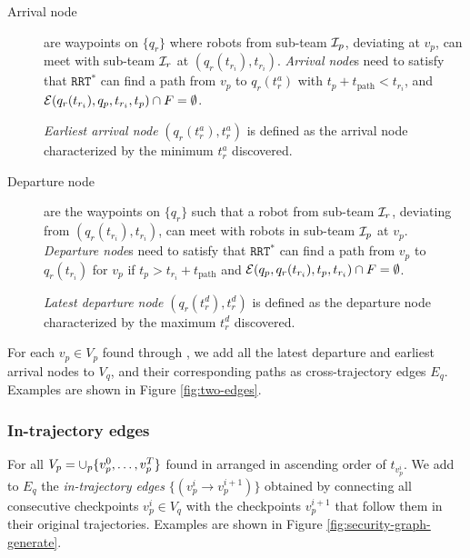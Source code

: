 \documentclass[journal]{IEEEtran}  %
\newcommand{\rrtstar}{$\texttt{RRT}^\texttt{*}$}
\begin{document}
\begin{description}
\item[Arrival node] are waypoints on $\{q_r\}$ where robots from sub-team $\mathcal{I}_p$, deviating at $v_p$, can meet with sub-team $\mathcal{I}_r$ at $(q_r(t_{r_i}),t_{r_i})$. \emph{Arrival node}s need to satisfy that \rrtstar{} can find a path from $v_p$ to $q_{r}(t^{a}_r)$ with $t_{p}+t_{\textrm{path}}<t_{{r}_{i}}$, and $\mathcal{E}(q_{r}(t_{{r}_{i}}),q_{p},t_{{r}_{i}},t_{p}) \cap F = \emptyset$.

\emph{Earliest arrival node} $(q_{r}(t^{a}_r),t^{a}_r)$ is defined as the arrival node characterized by the minimum $t^{a}_r$ discovered. 

\item[Departure node] are the waypoints on $\{q_r\}$ such that a robot from sub-team $\mathcal{I}_r$, deviating from $(q_{r}(t_{{r}_{i}}),t_{{r}_{i}})$, can meet with robots in sub-team $\mathcal{I}_p$ at $v_{p}$. \emph{Departure node}s need to satisfy that \rrtstar{} can find a path from $v_p$ to $q_{r}(t_{{r}_{i}})$ for $v_p$ if  $t_{p}>t_{{r}_{i}}+t_{\textrm{path}}$ and $\mathcal{E}(q_{p}, q_{r}(t_{{r}_{i}}),t_{p}, t_{{r}_{i}}) \cap F = \emptyset$. 

\emph{Latest departure node} $(q_{r}(t^{d}_r),t^{d}_r)$ is defined as the departure node characterized by the maximum $t^{d}_r$ discovered.
\end{description}

For each $v_{p} \in V_{p}$ found through , we add all the latest departure and earliest arrival nodes to $V_{q}$, and their corresponding paths as cross-trajectory edges $E_{q}$. Examples are shown in Figure \ref{fig:two-edges}.

\subsubsection{In-trajectory edges}\label{sec:Graph-intro}

For all $V_{p}=\cup_p \{v^0_{p}, \dots ,v^T_{p}\}$ found in  arranged in ascending order of $t_{v^i_{p}}$. We add to $E_q$ the \emph{in-trajectory edges} $\{(v^i_{p}\rightarrow v^{i+1}_{p})\}$ obtained by connecting all consecutive checkpoints $v^i_{p}\in V_q$ with the checkpoints $v^{i+1}_{p}$ that follow them in their original trajectories. Examples are shown in Figure \ref{fig:security-graph-generate}. 
\end{document}
